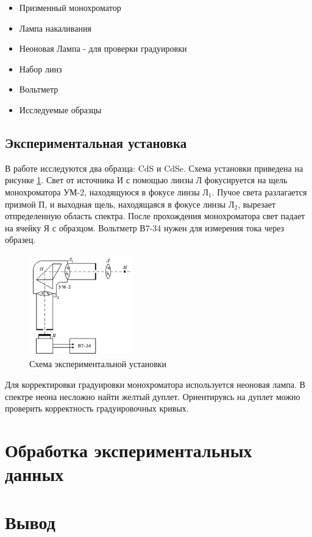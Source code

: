 \documentclass[a4paper, 14pt]{article}
\begin{document}
\begin{itemize}
    \item Призменный монохроматор 
    \item Лампа накаливания 
    \item Неоновая Лампа - для проверки градуировки
    \item Набор линз 
    \item Вольтметр
    \item Исследуемые образцы 
\end{itemize}

\subsection*{\textcolor{sub_header}{Экспериментальная установка}}

В работе исследуются два образца: CdS и CdSe. 
Схема установки приведена на рисунке \ref{pic:scheme}. 
Свет от источника И с помощью линзы Л фокусируется на щель монохроматора УМ-2, 
находящуюся в фокусе линзы Л$_1$. Пучое света разлагается призмой П, и выходная щель, находящаяся в фокусе линзы Л$_2$, вырезает отпределенную область спектра. После прохождения монохроматора свет падает на ячейку Я с образцом. Вольтметр В7-34 нужен для измерения тока через образец. 

\begin{figure}[h]

    \centering	
    \includegraphics[width=0.4\textwidth]{lab.png}
    \caption{Схема экспериментальной установки}
    \label{pic:scheme}
\end{figure} 

Для корректировки градуировки монохроматора используется неоновая лампа. В спектре неона несложно найти 
желтый дуплет. Ориентируясь на дуплет можно проверить корректность градуировочных кривых.


\section*{\textcolor{header}{Обработка экспериментальных данных}}



\section*{\textcolor{header}{Вывод}}
\end{document}
